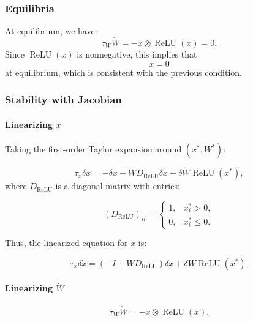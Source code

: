 \documentclass{article}
\theoremstyle{definition} \newtheorem{definition}{Definition}
\theoremstyle{remark} \newtheorem{remark}{Remark}
\newcounter{ct}
\begin{document}
\subsubsection{Equilibria}
At equilibrium, we have:
\begin{equation}
    \tau_W \dot{W} = - \dot{x} \otimes \operatorname{ReLU}(x) = 0.
\end{equation}
Since \( \operatorname{ReLU}(x) \) is nonnegative, this implies that
\begin{equation}
    \dot{x} = 0
\end{equation}
at equilibrium, which is consistent with the previous condition.


\subsubsection{Stability with Jacobian}
\citep{wersing2001dynamical}
\paragraph{Linearizing $\dot x$}
Taking the first-order Taylor expansion around \( (x^*, W^*) \):

\begin{equation}
    \tau_x \delta \dot{x} = -\delta x + W D_{\operatorname{ReLU}} \delta x + \delta W \operatorname{ReLU}(x^*),
\end{equation}
where \( D_{\operatorname{ReLU}} \) is a diagonal matrix with entries:

\begin{equation}
    (D_{\operatorname{ReLU}})_{ii} =
    \begin{cases}
        1, & x^*_i > 0, \\
        0, & x^*_i \leq 0.
    \end{cases}
\end{equation}

Thus, the linearized equation for \( \dot{x} \) is:

\begin{equation}
    \tau_x \delta \dot{x} = (-I + W D_{\operatorname{ReLU}}) \delta x + \delta W \operatorname{ReLU}(x^*).
\end{equation}


\paragraph{Linearizing $\dot W$}

\begin{equation}
    \tau_W \dot{W} = - \dot{x} \otimes \operatorname{ReLU}(x).
\end{equation}
\end{document}
